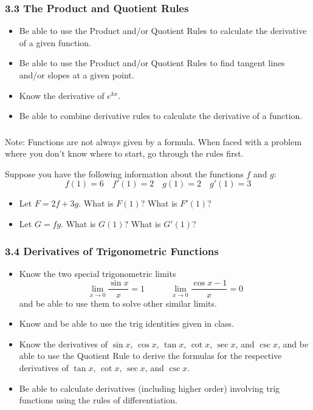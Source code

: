 \documentclass[14pt]{beamer}
\begin{document}
\begin{frame}
\frametitle{3.3 The Product and Quotient Rules}
\small
\begin{itemize}
\item Be able to use the Product and/or Quotient Rules to calculate the derivative of a given function.
\item Be able to use the Product and/or Quotient Rules to find tangent lines and/or slopes at a given point.
\item Know the derivative of $e^{kx}$.
\item Be able to combine derivative rules to calculate the derivative of a function.
\end{itemize}
\end{frame}

\begin{frame}
\frametitle{}
\small
Note: Functions are not always given by a formula.  When faced with a problem where you don't know where to start, go through the rules first.
\begin{exe} Suppose you have the following information about the functions $f$ and $g$:
\[f(1)=6\quad f'(1)=2\quad g(1)=2\quad g'(1)=3\]
\begin{itemize}
\item Let $F=2f+3g$.  What is $F(1)$?  What is $F'(1)$?
\item Let $G=fg$.  What is $G(1)$?  What is $G'(1)$?
\end{itemize}
\end{exe}
\end{frame}

\begin{frame}
\frametitle{3.4 Derivatives of Trigonometric Functions}
\footnotesize
\begin{itemize}
\item Know the two special trigonometric limits
$$\lim_{x \to 0} \frac{\sin x}{x}=1 \quad\quad\quad \lim_{x \to 0} \frac{\cos x -1}{x}=0$$
and be able to use them to solve other similar limits.
\item Know and be able to use the trig identities given in class.
\item Know the derivatives of $\sin x$, $\cos x$, $\tan x$, $\cot x$, $\sec x$, and $\csc x$, and be able to use the Quotient Rule to derive the formulas for the respective derivatives of
$\tan x$, $\cot x$, $\sec x$, and $\csc x$.
\item Be able to calculate derivatives (including higher order) involving trig functions using the rules of differentiation.
\end{itemize}
\end{frame}
\end{document}
